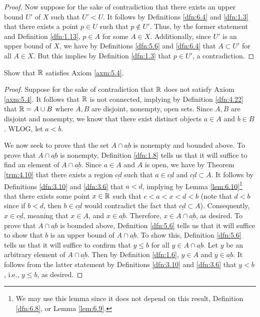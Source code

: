 \documentclass[../main.tex]{subfiles}
\begin{document}
\begin{lemma}
\begin{proof}
        Now suppose for the sake of contradiction that there exists an upper bound $U'$ of $X$ such that $U'<U$. It follows by Definitions \ref{dfn:6.4} and \ref{dfn:1.3} that there exists a point $p\in U$ such that $p\notin U'$. Thus, by the former statement and Definition \ref{dfn:1.13}, $p\in A$ for some $A\in X$. Additionally, since $U'$ is an upper bound of $X$, we have by Definitions \ref{dfn:5.6} and \ref{dfn:6.4} that $A\subset U'$ for all $A\in X$. But this implies by Definition \ref{dfn:1.3} that $p\in U'$, a contradiction.
    \end{proof}
\end{lemma}

\begin{exercise}\label{exr:6.7}
    Show that $\mathbb{R}$ satisfies Axiom \ref{axm:5.4}.
    \begin{proof}
        Suppose for the sake of contradiction that $\mathbb{R}$ does not satisfy Axiom \ref{axm:5.4}. It follows that $\mathbb{R}$ is not connected, implying by Definition \ref{dfn:4.22} that $\mathbb{R}=A\cup B$ where $A,B$ are disjoint, nonempty, open sets. Since $A,B$ are disjoint and nonempty, we know that there exist distinct objects $a\in A$ and $b\in B$. WLOG, let $a<b$.\par
        We now seek to prove that the set $A\cap\underline{ab}$ is nonempty and bounded above. To prove that $A\cap\underline{ab}$ is nonempty, Definition \ref{dfn:1.8} tells us that it will suffice to find an element of $A\cap\underline{ab}$. Since $a\in A$ and $A$ is open, we have by Theorem \ref{trm:4.10} that there exists a region $\underline{cd}$ such that $a\in\underline{cd}$ and $\underline{cd}\subset A$. It follows by Definitions \ref{dfn:3.10} and \ref{dfn:3.6} that $a<d$, implying by Lemma \ref{lem:6.10}\footnote{We may use this lemma since it does not depend on this result, Definition \ref{dfn:6.8}, or Lemma \ref{lem:6.9}.} that there exists some point $x\in\mathbb{R}$ such that $c<a<x<d<b$ (note that $d<b$ since if $b<d$, then $b\in\underline{cd}$ would contradict the fact that $\underline{cd}\subset A$). Consequently, $x\in\underline{cd}$, meaning that $x\in A$, and $x\in\underline{ab}$. Therefore, $x\in A\cap\underline{ab}$, as desired. To prove that $A\cap\underline{ab}$ is bounded above, Definition \ref{dfn:5.6} tells us that it will suffice to show that $b$ is an upper bound of $A\cap\underline{ab}$. To show this, Definition \ref{dfn:5.6} tells us that it will suffice to confirm that $y\leq b$ for all $y\in A\cap\underline{ab}$. Let $y$ be an arbitrary element of $A\cap\underline{ab}$. Then by Definition \ref{dfn:1.6}, $y\in A$ and $y\in\underline{ab}$. It follows from the latter statement by Definitions \ref{dfn:3.10} and \ref{dfn:3.6} that $y<b$, i.e., $y\leq b$, as desired.\par

\end{proof}
\end{exercise}
\end{document}
